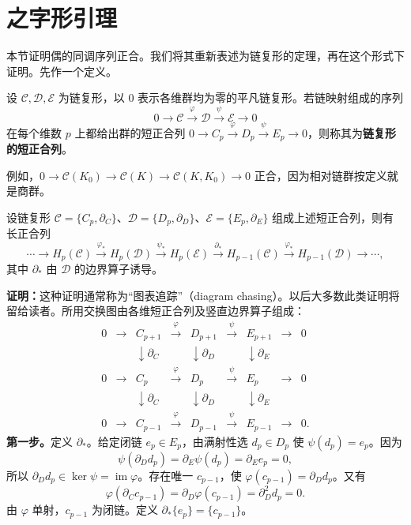 \section{之字形引理}
本节证明偶的同调序列正合。我们将其重新表述为链复形的定理，再在这个形式下证明。先作一个定义。

设 $\mathcal C,\mathcal D,\mathcal E$ 为链复形，以 $0$ 表示各维群均为零的平凡链复形。若链映射组成的序列
\[
0\to\mathcal C\xrightarrow{\varphi}\mathcal D\xrightarrow{\psi}\mathcal E\to0
\]
在每个维数 $p$ 上都给出群的短正合列 $0\to C_p\xrightarrow{\varphi}D_p\xrightarrow{\psi}E_p\to0$，则称其为\textbf{链复形的短正合列}。

例如，$0\to\mathcal C(K_0)\to\mathcal C(K)\to\mathcal C(K,K_0)\to0$ 正合，因为相对链群按定义就是商群。

设链复形 $\mathcal C=\{C_p,\partial_C\}$、$\mathcal D=\{D_p,\partial_D\}$、$\mathcal E=\{E_p,\partial_E\}$ 组成上述短正合列，则有长正合列
\[
\cdots\to H_p(\mathcal C)\xrightarrow{\varphi_*}H_p(\mathcal D)
\xrightarrow{\psi_*}H_p(\mathcal E)\xrightarrow{\partial_*}H_{p-1}(\mathcal C)
\xrightarrow{\varphi_*}H_{p-1}(\mathcal D)\to\cdots,
\]
其中 $\partial_*$ 由 $\mathcal D$ 的边界算子诱导。

\noindent\textbf{证明：}这种证明通常称为“图表追踪”（diagram chasing）。以后大多数此类证明将留给读者。所用交换图由各维短正合列及竖直边界算子组成：
\[
\begin{array}{ccccccccc}
0&\to&C_{p+1}&\xrightarrow{\varphi}&D_{p+1}&\xrightarrow{\psi}&E_{p+1}&\to&0\\
&&\downarrow\scriptstyle\partial_C&&\downarrow\scriptstyle\partial_D&&\downarrow\scriptstyle\partial_E\\
0&\to&C_p&\xrightarrow{\varphi}&D_p&\xrightarrow{\psi}&E_p&\to&0\\
&&\downarrow\scriptstyle\partial_C&&\downarrow\scriptstyle\partial_D&&\downarrow\scriptstyle\partial_E\\
0&\to&C_{p-1}&\xrightarrow{\varphi}&D_{p-1}&\xrightarrow{\psi}&E_{p-1}&\to&0.
\end{array}
\]
\textbf{第一步。}定义 $\partial_*$。给定闭链 $e_p\in E_p$，由满射性选 $d_p\in D_p$ 使 $\psi(d_p)=e_p$。因为
\[
\psi(\partial_Dd_p)=\partial_E\psi(d_p)=\partial_Ee_p=0,
\]
所以 $\partial_Dd_p\in\ker\psi=\operatorname{im}\varphi$。存在唯一 $c_{p-1}$，使 $\varphi(c_{p-1})=\partial_Dd_p$。又有
\[
\varphi(\partial_Cc_{p-1})=\partial_D\varphi(c_{p-1})=\partial_D^2d_p=0.
\]
由 $\varphi$ 单射，$c_{p-1}$ 为闭链。定义 $\partial_*\{e_p\}=\{c_{p-1}\}$。

